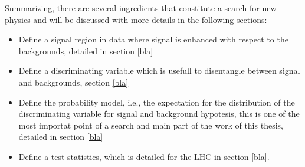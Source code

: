 

Summarizing, there are several ingredients that constitute a search for new physics and will be discussed 
with more details in the following sections:
\begin{itemize}
	\item Define a signal region in data where signal is enhanced with respect to the backgrounds, detailed in section \ref{bla}
	\item Define a discriminating variable which is usefull to disentangle between signal and backgrounds, section \ref{bla}
	\item Define the probability model, i.e., the expectation for the distribution of the discriminating variable
		 for signal and background hypotesis, this is one of the most importat
		point of a search and main part of the work of this thesis, detailed in section \ref{bla}
	\item Define a test statistics, which is detailed for the LHC in section \ref{bla}.
\end{itemize}

